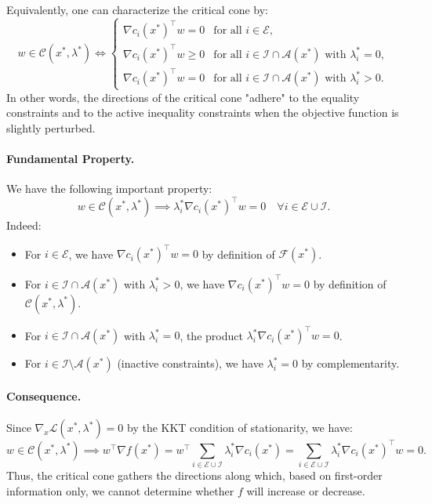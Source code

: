 \begin{remarque}
    Equivalently, one can characterize the critical cone by:
    \begin{equation}
        w \in \mathcal{C}(x^*, \lambda^*) \iff 
        \begin{cases}
            \nabla c_i(x^*)^\top w = 0 & \text{for all } i \in \mathcal{E}, \\
            \nabla c_i(x^*)^\top w \geq 0 & \text{for all } i \in \mathcal{I} \cap \mathcal{A}(x^*) \text{ with } \lambda_i^* = 0, \\
            \nabla c_i(x^*)^\top w = 0 & \text{for all } i \in \mathcal{I} \cap \mathcal{A}(x^*) \text{ with } \lambda_i^* > 0.
        \end{cases}
    \end{equation}
    In other words, the directions of the critical cone "adhere" to the equality constraints and to the active inequality constraints when the objective function is slightly perturbed.
    
    \paragraph{Fundamental Property.}
    We have the following important property:
    \begin{equation}
        w \in \mathcal{C}(x^*, \lambda^*) \implies \lambda_i^* \nabla c_i(x^*)^\top w = 0 \quad \forall i \in \mathcal{E} \cup \mathcal{I}.
    \end{equation}
    Indeed:
    \begin{itemize}
        \item For $i \in \mathcal{E}$, we have $\nabla c_i(x^*)^\top w = 0$ by definition of $\mathcal{F}(x^*)$.
        \item For $i \in \mathcal{I} \cap \mathcal{A}(x^*)$ with $\lambda_i^* > 0$, we have $\nabla c_i(x^*)^\top w = 0$ by definition of $\mathcal{C}(x^*, \lambda^*)$.
        \item For $i \in \mathcal{I} \cap \mathcal{A}(x^*)$ with $\lambda_i^* = 0$, the product $\lambda_i^* \nabla c_i(x^*)^\top w = 0$.
        \item For $i \in \mathcal{I} \setminus \mathcal{A}(x^*)$ (inactive constraints), we have $\lambda_i^* = 0$ by complementarity.
    \end{itemize}
    
    \paragraph{Consequence.} Since $\nabla_x \mathcal{L}(x^*, \lambda^*) = 0$ by the KKT condition of stationarity, we have:
    \begin{equation}
        w \in \mathcal{C}(x^*, \lambda^*) \implies w^\top \nabla f(x^*) = w^\top \sum_{i \in \mathcal{E} \cup \mathcal{I}} \lambda_i^* \nabla c_i(x^*) = \sum_{i \in \mathcal{E} \cup \mathcal{I}} \lambda_i^* \nabla c_i(x^*)^\top w = 0.
    \end{equation}
    Thus, the critical cone gathers the directions along which, based on first-order information only, we cannot determine whether $f$ will increase or decrease.
\end{remarque}

